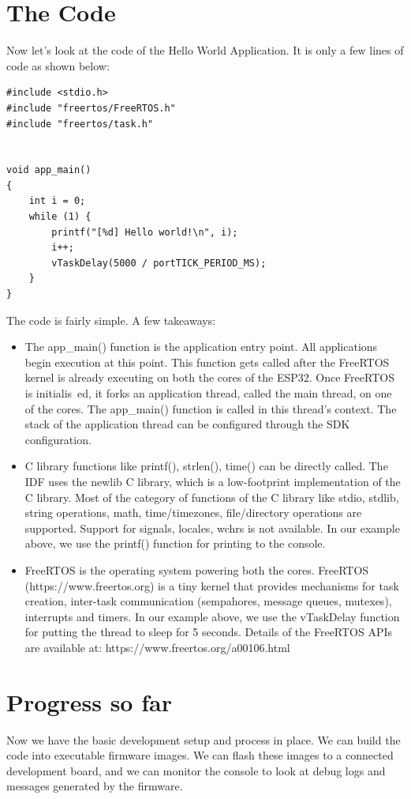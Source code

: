 \documentclass[11pt,fleqn]{book} %
\begin{document}
\section{The Code}
Now let's look at the code of the Hello World Application. It is only a few lines of code as shown below:
\begin{verbatim}
#include <stdio.h>
#include "freertos/FreeRTOS.h"
#include "freertos/task.h"


void app_main()
{
    int i = 0;
    while (1) {
        printf("[%d] Hello world!\n", i);
        i++;
        vTaskDelay(5000 / portTICK_PERIOD_MS);
    }
}
\end{verbatim}
The code is fairly simple. A few takeaways:
\begin{itemize}
\item The app\_main() function is the application entry point. All applications begin execution at this point. This function gets called after the FreeRTOS kernel is already executing on both the cores of the ESP32. Once FreeRTOS is initialis\
ed, it forks an application thread, called the main thread, on one of the cores. The app\_main() function is called in this thread's context. The stack of the application thread can be configured through the SDK configuration.
\item C library functions like printf(), strlen(), time() can be directly called. The IDF uses the newlib C library, which is a low-footprint implementation of the C library. Most of the category of functions of the C library like stdio, stdlib, string operations, math, time/timezones, file/directory operations are supported. Support for signals, locales, wchrs is not available. In our example above, we use the printf() function for printing to the console.
\item FreeRTOS is the operating system powering both the cores. FreeRTOS (https://www.freertos.org) is a tiny kernel that provides mechanisms for task creation, inter-task communication (sempahores, message queues, mutexes), interrupts and timers. In our example above, we use the vTaskDelay function for putting the thread to sleep for 5 seconds. Details of the FreeRTOS APIs are available at: https://www.freertos.org/a00106.html
\end{itemize}

\section{Progress so far}
Now we have the basic development setup and process in place. We can build the code into executable firmware images. We can flash these images to a connected development board, and we can monitor the console to look at debug logs and messages generated by the firmware. 
\end{document}
